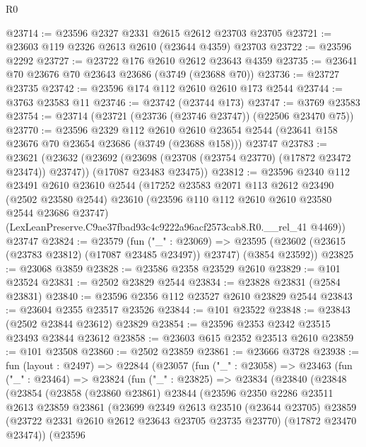 \begin{lexlean}{R0}
\begin{coremodule}
@23714 := @23596 @2327 @2331 @2615 @2612 @23703 @23705
@23721 := @23603 @119 @2326 @2613 @2610 (@23644 @4359) @23703
@23722 := @23596 @2292
@23727 := @23722 @176 @2610 @2612 @23643 @4359
@23735 := @23641 @70 @23676 @70 @23643 @23686 (@3749 (@23688 @70))
@23736 := @23727 @23735
@23742 := @23596 @174 @112 @2610 @2610 @173 @2544
@23744 := @3763 @23583 @11
@23746 := @23742 (@23744 @173)
@23747 := @3769 @23583
@23754 := @23714 (@23721 (@23736 (@23746 @23747)) (@22506 @23470 @75))
@23770 := @23596
    @2329
    @112
    @2610
    @2610
    @23654
    @2544
    (@23641 @158 @23676 @70 @23654 @23686 (@3749 (@23688 @158)))
    @23747
@23783 := @23621
    (@23632
      (@23692 (@23698 (@23708 (@23754 @23770) (@17872 @23472 @23474)) @23747))
      (@17087 @23483 @23475))
@23812 := @23596
    @2340
    @112
    @23491
    @2610
    @23610
    @2544
    (@17252
      @23583
      @2071
      @113
      @2612
      @23490
      (@2502 @23580 @2544)
      @23610
      (@23596 @110 @112 @2610 @2610 @23580 @2544 @23686 @23747)
      (LexLeanPreserve.C9ae37fbad93c4c9222a96acf2573cab8.R0.__rel_41 @4469))
    @23747
@23824 := @23579
    (fun ("_" : @23069) =>
    @23595 (@23602 (@23615 (@23783 @23812) (@17087 @23485 @23497)) @23747) (@3854 @23592))
@23825 := @23068 @3859
@23828 := @23586 @2358 @23529 @2610
@23829 := @101 @23524
@23831 := @2502 @23829 @2544
@23834 := @23828 @23831 (@2584 @23831)
@23840 := @23596 @2356 @112 @23527 @2610 @23829 @2544
@23843 := @23604 @2355 @23517 @23526
@23844 := @101 @23522
@23848 := @23843 (@2502 @23844 @23612) @23829
@23854 := @23596 @2353 @2342 @23515 @23493 @23844 @23612
@23858 := @23603 @615 @2352 @23513 @2610
@23859 := @101 @23508
@23860 := @2502 @23859
@23861 := @23666 @3728
@23938 := fun (layout : @2497) =>
  @22844
    (@23057
      (fun ("_" : @23058) =>
      @23463
        (fun ("_" : @23464) =>
        @23824
          (fun ("_" : @23825) =>
          @23834
            (@23840
              (@23848
                (@23854
                  (@23858
                    (@23860 @23861)
                    @23844
                    (@23596
                      @2350
                      @2286
                      @23511
                      @2613
                      @23859
                      @23861
                      (@23699
                        @2349
                        @2613
                        @23510
                        (@23644 @23705)
                        @23859
                        (@23722 @2331 @2610 @2612 @23643 @23705 @23735 @23770)
                        (@17872 @23470 @23474))
                      (@23596

\end{coremodule}
\end{lexlean}
